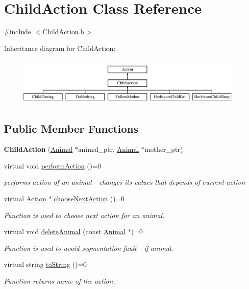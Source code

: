 \hypertarget{class_child_action}{}\section{Child\+Action Class Reference}
\label{class_child_action}


{\ttfamily \#include $<$Child\+Action.\+h$>$}

Inheritance diagram for Child\+Action\+:\begin{figure}[H]
\begin{center}
\leavevmode
\includegraphics[height=2.434783cm]{class_child_action}
\end{center}
\end{figure}
\subsection*{Public Member Functions}
\begin{DoxyCompactItemize}
\item 
\hypertarget{class_child_action_a13b43858371a74d598060840ebe2ba36}{}{\bfseries Child\+Action} (\hyperlink{class_animal}{Animal} $\ast$animal\+\_\+ptr, \hyperlink{class_animal}{Animal} $\ast$mother\+\_\+ptr)\label{class_child_action_a13b43858371a74d598060840ebe2ba36}

\item 
virtual void \hyperlink{class_child_action_a8b92e893b56c1741816149162c16d5be}{perform\+Action} ()=0
\begin{DoxyCompactList}\small\item\em performs action of an animal -\/ changes it\textquotesingle{}s values that depends of current action \end{DoxyCompactList}\item 
virtual \hyperlink{class_action}{Action} $\ast$ \hyperlink{class_child_action_a07c04b7ca874308f2209050998f1643d}{choose\+Next\+Action} ()=0
\begin{DoxyCompactList}\small\item\em Function is used to choose next action for an animal. \end{DoxyCompactList}\item 
virtual void \hyperlink{class_child_action_a153a1578923e7e55687550e53fec21bc}{delete\+Animal} (const \hyperlink{class_animal}{Animal} $\ast$)=0
\begin{DoxyCompactList}\small\item\em Function is used to avoid segmentation fault -\/ if animal. \end{DoxyCompactList}\item 
virtual string \hyperlink{class_child_action_ab079f9b34939cb040e129c7966222bbd}{to\+String} ()=0
\begin{DoxyCompactList}\small\item\em Function returns name of the action. \end{DoxyCompactList}\end{DoxyCompactItemize}
